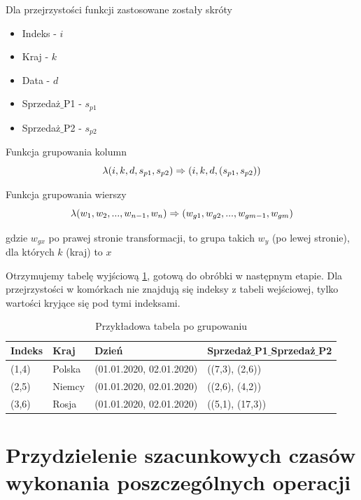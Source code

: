 \documentclass[brudnopis]{xmgr}
\begin{document}
Dla przejrzystości funkcji zastosowane zostały skróty
\medskip

\begin{itemize}
    \item Indeks - $i$
    \item Kraj - $k$
    \item Data - $d$
    \item Sprzedaż$\_$P1 - $s_{p1}$
    \item Sprzedaż$\_$P2 - $s_{p2}$
\end{itemize}
\medskip

Funkcja grupowania kolumn
\begin{equation} \label{eq:example-col-agg}
\lambda (i, k, d, s_{p1}, s_{p2}) \\ \Rightarrow (i, k, d, (s_{p1}, s_{p2}))
\end{equation}
\medskip

Funkcja grupowania wierszy
\begin{equation} \label{eq:example-row-agg}
\lambda (w_1, w_2, ..., w_{n-1}, w_n) \\ \Rightarrow (w_{g1}, w_{g2}, ..., w_{gm-1}, w_{gm}) 
\end{equation}
\medskip

gdzie $w_{gx}$ po prawej stronie transformacji, to grupa takich $w_y$ (po lewej stronie), dla których $k$ (kraj) to $x$
\medskip

Otrzymujemy tabelę wyjściową \ref{tab:example-output}, gotową do obróbki w następnym etapie.
Dla przejrzystości w komórkach nie znajdują się indeksy z tabeli wejściowej, tylko wartości kryjące się pod tymi indeksami.

\begin{table}[!tbh]
\begin{tabular}{|l|l|l|l|} \hline
Indeks & Kraj & Dzień & Sprzedaż$\_$P1$\_$Sprzedaż$\_$P2 \\ \hline
(1,4) & Polska & (01.01.2020, 02.01.2020) & ((7,3), (2,6)) \\ \hline
(2,5) & Niemcy & (01.01.2020, 02.01.2020) & ((2,6), (4,2)) \\ \hline
(3,6) & Rosja & (01.01.2020, 02.01.2020) & ((5,1), (17,3)) \\ \hline
\end{tabular}
\caption{Przykładowa tabela po grupowaniu\label{tab:example-output}}
\end{table}
\newpage


\section{Przydzielenie szacunkowych czasów wykonania poszczególnych operacji}
\end{document}
